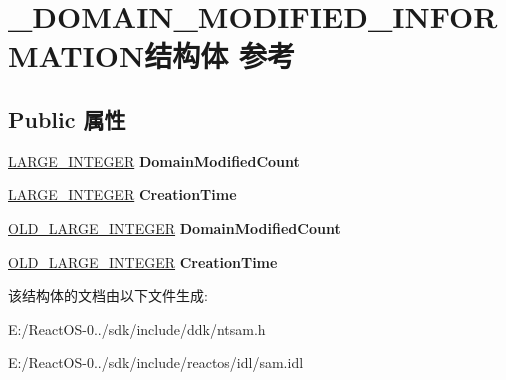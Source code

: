 \hypertarget{struct___d_o_m_a_i_n___m_o_d_i_f_i_e_d___i_n_f_o_r_m_a_t_i_o_n}{}\section{\+\_\+\+D\+O\+M\+A\+I\+N\+\_\+\+M\+O\+D\+I\+F\+I\+E\+D\+\_\+\+I\+N\+F\+O\+R\+M\+A\+T\+I\+O\+N结构体 参考}
\label{struct___d_o_m_a_i_n___m_o_d_i_f_i_e_d___i_n_f_o_r_m_a_t_i_o_n}
\subsection*{Public 属性}
\begin{DoxyCompactItemize}
\item 
\mbox{\label{struct___d_o_m_a_i_n___m_o_d_i_f_i_e_d___i_n_f_o_r_m_a_t_i_o_n_a4ffffa085bfcaeb8e47edbec32ce2e55}} 
\hyperlink{union___l_a_r_g_e___i_n_t_e_g_e_r}{L\+A\+R\+G\+E\+\_\+\+I\+N\+T\+E\+G\+ER} {\bfseries Domain\+Modified\+Count}
\item 
\mbox{\label{struct___d_o_m_a_i_n___m_o_d_i_f_i_e_d___i_n_f_o_r_m_a_t_i_o_n_a98bcf04a05d6ebaa643ea32e17e09c47}} 
\hyperlink{union___l_a_r_g_e___i_n_t_e_g_e_r}{L\+A\+R\+G\+E\+\_\+\+I\+N\+T\+E\+G\+ER} {\bfseries Creation\+Time}
\item 
\mbox{\label{struct___d_o_m_a_i_n___m_o_d_i_f_i_e_d___i_n_f_o_r_m_a_t_i_o_n_a0194be2637be9c032e596a3fb24f6a94}} 
\hyperlink{struct___o_l_d___l_a_r_g_e___i_n_t_e_g_e_r}{O\+L\+D\+\_\+\+L\+A\+R\+G\+E\+\_\+\+I\+N\+T\+E\+G\+ER} {\bfseries Domain\+Modified\+Count}
\item 
\mbox{\label{struct___d_o_m_a_i_n___m_o_d_i_f_i_e_d___i_n_f_o_r_m_a_t_i_o_n_a0baa8592516a1f704260e99ecafc962b}} 
\hyperlink{struct___o_l_d___l_a_r_g_e___i_n_t_e_g_e_r}{O\+L\+D\+\_\+\+L\+A\+R\+G\+E\+\_\+\+I\+N\+T\+E\+G\+ER} {\bfseries Creation\+Time}
\end{DoxyCompactItemize}


该结构体的文档由以下文件生成\+:\begin{DoxyCompactItemize}
\item 
E\+:/\+React\+O\+S-\/0../sdk/include/ddk/ntsam.\+h\item 
E\+:/\+React\+O\+S-\/0../sdk/include/reactos/idl/sam.\+idl\end{DoxyCompactItemize}
